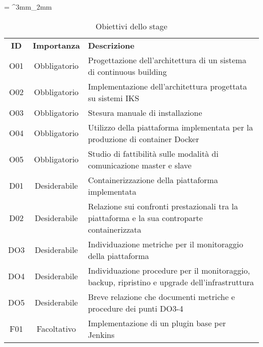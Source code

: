 \tabulinesep = ^3mm_2mm
\begin{longtabu} to \textwidth {ccX}
    \caption[Obiettivi dello stage]{Obiettivi dello stage}
    \label{tab:obiettivi-iniziali}
    \endlastfoot
    \rowfont{\bfseries\sffamily\leavevmode\color{white}}
    \textbf{ID} & \textbf{Importanza} & \textbf{Descrizione} \\
    O01 & Obbligatorio & Progettazione dell’architettura di un sistema di \gls{continuous building} \\ %
    O02 & Obbligatorio & Implementazione dell’architettura progettata su sistemi IKS \\ %
    O03 & Obbligatorio & Stesura manuale di installazione \\ %
    O04 & Obbligatorio & Utilizzo della piattaforma implementata per la produzione di \gls{container} Docker \\ %
    O05 & Obbligatorio & Studio di fattibilità sulle modalità di comunicazione \gls{master} e \gls{slave} \\ %
    D01 & Desiderabile & Containerizzazione della piattaforma implementata \\ %
    D02 & Desiderabile & Relazione sui confronti prestazionali tra la piattaforma e la sua controparte containerizzata \\ %
    DO3 & Desiderabile & Individuazione metriche per il monitoraggio della piattaforma \\ %
    DO4 & Desiderabile &  Individuazione procedure per il monitoraggio, backup, ripristino e upgrade dell’infrastruttura \\ %
    DO5 & Desiderabile & Breve relazione che documenti metriche e procedure dei punti DO3-4 \\ %
    F01 & Facoltativo & Implementazione di un plugin base per Jenkins \\ %
\end{longtabu}
\clearpage